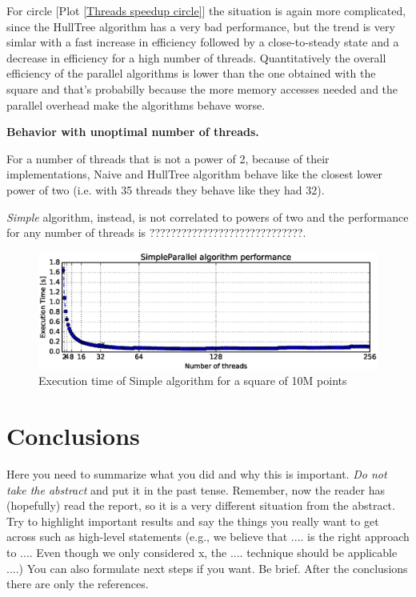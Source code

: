 \documentclass[letterpaper]{article}
\newcommand{\mypar}[1]{{\bf #1.}}
\begin{document}
For circle [Plot \ref{Threads speedup circle}] the situation is again more complicated, since the HullTree algorithm has a very bad performance, but the trend is very simlar with a fast increase in efficiency followed by a close-to-steady state and a decrease in efficiency for a high number of threads.
Quantitatively the overall efficiency of the parallel algorithms is lower than the one obtained with the square and that's probabilly because the more memory accesses needed and the parallel overhead make the algorithms behave worse.

\mypar{Behavior with unoptimal number of threads}

For a number of threads that is not a power of 2, because of their implementations, Naive and HullTree algorithm behave like the closest lower power of two (i.e. with 35 threads they behave like they had 32).

\textit{Simple} algorithm, instead, is not correlated to powers of two and the performance for any number of threads is ?????????????????????????????.

\begin{figure}[!ht]\centering
  \includegraphics[scale=0.33]{./plots/total.eps}
  \caption{Execution time of Simple algorithm for a square of 10M points\label{SimpleParallel Total}}
\end{figure}


\section{Conclusions}

Here you need to summarize what you did and why this is
important. {\em Do not take the abstract} and put it in the past
tense. Remember, now the reader has (hopefully) read the report, so it
is a very different situation from the abstract. Try to highlight
important results and say the things you really want to get across
such as high-level statements (e.g., we believe that .... is the right
approach to .... Even though we only considered x, the
.... technique should be applicable ....) You can also formulate next
steps if you want. Be brief. After the conclusions there are only the references.
\end{document}
